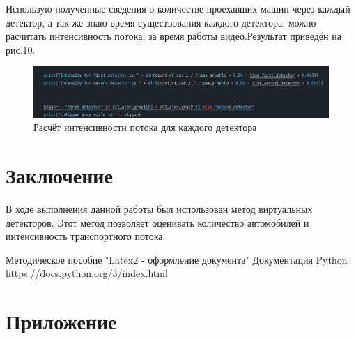 \documentclass[a4paper,12pt]{article}
\begin{document}
\newpage

Использую полученные сведения о количестве проехавших машин через каждый детектор, а так же знаю время существования каждого детектора, можно расчитать интенсивность потока, за время работы видео.Результат приведён на рис.10.

\begin{figure}[h!]
  \begin{center}
      \includegraphics[width=0.8\linewidth]{intensity}
      \caption{Расчёт интенсивности потока для каждого детектора} 
      \label{} 
  \end{center} 
\end{figure}

\newpage  

\section*{Заключение}
В ходе выполнения данной работы был использован метод виртуальных детекторов. Этот метод позволяет оценивать количество автомобилей и интенсивность транспортного потока. 

\newpage 

\begin{thebibliography}{}
  Методическое пособие "Latex2 - оформление документа"
  Документация Python https://docs.python.org/3/index.html

  
\end{thebibliography}

\newpage 

\section*{Приложение}
\end{document}

